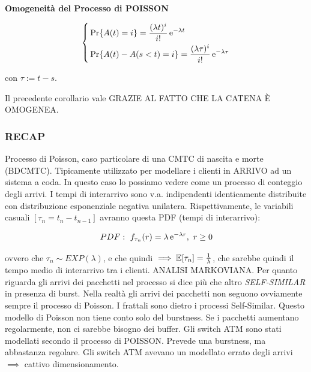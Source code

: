 \begin{corl}{\textbf{Omogeneità del Processo di POISSON}}

\[
	\left\{
	\begin{aligned}
	&\Pr\{A(t) = i\} = \frac{(\lambda t)^i}{i!}\mathop{}\!\mathrm{e}^{-\lambda t}\\
	&\Pr\{A(t)-A(s<t) = i\} = \frac{(\lambda \tau)^i}{i!}\mathop{}\!\mathrm{e}^{-\lambda \tau}
	\end{aligned}
	\right.
\]

con $\tau := t-s$. 

\end{corl}

Il precedente corollario vale GRAZIE AL FATTO CHE LA CATENA \`E OMOGENEA. 

\subsubsection{RECAP}

Processo di Poisson, caso particolare di una CMTC di nascita e morte (BDCMTC). Tipicamente utilizzato per modellare i clienti in ARRIVO ad un sistema a coda. In questo caso lo possiamo vedere come un processo di conteggio degli arrivi. I tempi di interarrivo sono v.a. indipendenti identicamente distribuite con distribuzione esponenziale negativa unilatera. Rispettivamente, le variabili casuali $[\tau_n = t_n-t_{n-1}]$ avranno questa PDF (tempi di interarrivo):

\[
	PDF:\ f_{\tau_n}(r) = \lambda\mathop{}\!\mathrm{e}^{-\lambda r},\ r \geq 0
\]

ovvero che $\tau_n \sim EXP(\lambda)$, e che quindi $\implies \operatorname{\mathbb{E}}[\tau_n] = \frac{1}{\lambda}$, che sarebbe quindi il tempo medio di interarrivo tra i clienti. ANALISI MARKOVIANA. Per quanto riguarda gli arrivi dei pacchetti nel processo si dice più che altro \textit{SELF-SIMILAR} in presenza di burst. Nella realtà gli arrivi dei pacchetti non seguono ovviamente sempre il processo di Poisson. I frattali sono dietro i processi Self-Similar. Questo modello di Poisson non tiene conto solo del burstness. Se i pacchetti aumentano regolarmente, non ci sarebbe bisogno dei buffer. Gli switch ATM sono stati modellati secondo il processo di POISSON. Prevede una burstness, ma abbastanza regolare. Gli switch ATM avevano un modellato errato degli arrivi $\implies$ cattivo dimensionamento.


